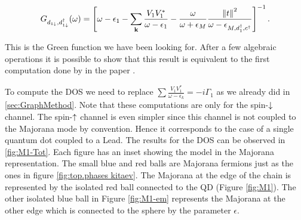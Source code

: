 \begin{equation}
    G_{d_{1\downarrow},d_{1\downarrow}^{\dagger}}(\omega)=\left[\omega-\epsilon_{1}-\sum_{\mathbf{k}}\frac{V_{1}V_{1}^{*}}{\omega-\epsilon_{1}}-\frac{\omega}{\omega+\epsilon_{M}}\frac{\left\Vert t\right\Vert ^{2}}{\omega -\epsilon_{M,d_1^\dagger,c^\dagger}}\right]^{-1}.
\end{equation}

\noindent This is the Green function we have been looking for. After a few algebraic operations it is possible to show that this result is equivalent to the first computation done by \citeauthor{liu_detecting_2011}  in the paper \cite{liu_detecting_2011}. 




To compute the DOS we need to replace $\sum \frac{V_1V^*_1}{\omega -\epsilon_k}= -i\Gamma_1$ as we already did in \ref{sec:GraphMethod}. Note that these computations are only for the spin-$\downarrow$ channel. The spin-$\uparrow$ channel is even simpler since this channel is not coupled to the Majorana mode by convention. Hence it corresponds to the case of a single quantum dot coupled to a Lead.  The results for the DOS can be observed in \ref{fig:M1-Tot}. Each figure has an inset showing the model in the Majorana representation. The small blue and red balls are Majorana fermions just as the ones in figure \ref{fig:top.phases kitaev}. The Majorana at the edge of the  chain is represented by the isolated red ball connected to the QD (Figure \ref{fig:M1}). The other isolated blue ball in Figure \ref{fig:M1-em} represents the Majorana at the other edge which is connected to the sphere by the parameter $\epsilon$. 



